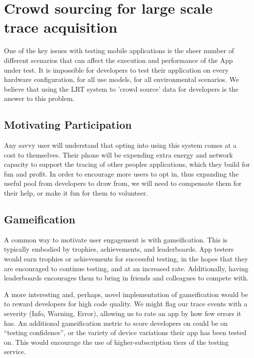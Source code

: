\section{Crowd sourcing for large scale trace acquisition}
\label{section:crowdsourcing}
One of the key issues with testing mobile applications is the sheer number
of different scenarios that can affect the execution and performance
of the App under test. It is impossible for developers to test their application
on every hardware configuration, for all use models, for all environmental scenarios.
We believe that using the LRT system to 'crowd source' data for developers
is the answer to this problem.

\subsection{Motivating Participation}
Any savvy user will understand that opting into using this system comes at a cost to themselves.
Their phone will be expending extra energy and network capacity to support the tracing of 
other peoples applications, which they build for fun and profit.
In order to encourage more users to opt in, thus expanding the useful pool from developers to draw from,
we will need to compensate them for their help, or make it fun for them to volunteer.

\subsection{Gameification}
A common way to motivate user engagement is with gameification. This is typically embodied
by trophies, achievements, and leaderboards. App testers would earn trophies or achievements
for successful testing, in the hopes that they are encouraged to continue testing, and at an
increased rate. Additionally, having leaderboards encourages them to bring in friends and colleagues
to compete with.

A more interesting and, perhaps, novel implementation of gameification would be to reward developers
for high code quality. We might flag our trace events with a severity (Info, Warning, Error), allowing
us to rate an app by how few errors it has. An additional gameification metric to score developers on
could be on ``testing confidence'', or the variety of device variations their app has been tested on.
This would encourage the use of higher-subscription tiers of the testing service.

